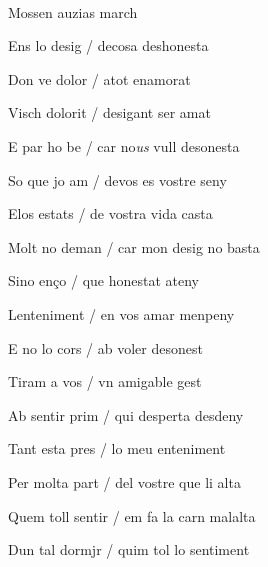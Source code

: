 \documentclass[12pt]{article}
\renewcommand{\espaiAbansEtiquetaPoema}{\vspace{0ex}}
\begin{document}
\begin{estrofa}

\espaiAbansEtiquetaPoema

\\

\begin{rubrica}

Mossen auzias march \clauTancada

\end{rubrica}

\end{estrofa}


\begin{estrofa}

 Ens lo desig / decosa deshonesta

 Don ve dolor / atot enamorat

 Visch dolorit / desigant ser amat

 E par ho be / car no\textit{us} vull desonesta

 So que jo am / devos es vostre seny

 Elos estats / de vostra vida casta

 Molt no deman / car mon desig no basta

 Sino en\c{c}o / que honestat ateny

\end{estrofa}



\begin{estrofa}

 Lenteniment / en vos amar menpeny

 E no lo cors / ab voler desonest

 Tiram a vos / vn amigable gest

 Ab sentir prim / qui desperta desdeny

 Tant esta pres / lo meu enteniment

 Per molta part / del vostre que li alta

 Quem toll sentir / em fa la carn malalta

 Dun tal dormjr / quim tol lo sentiment

\end{estrofa}
\end{document}
